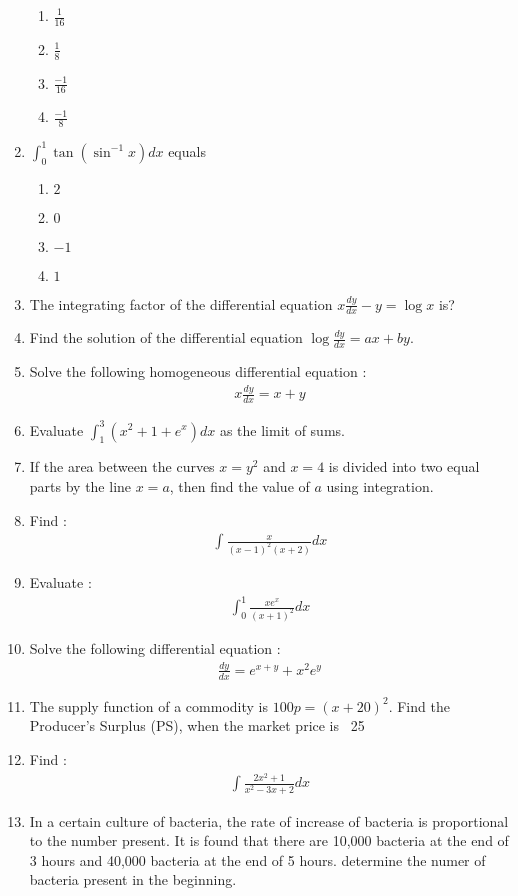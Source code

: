 \documentclass{article}
\begin{document}
\begin{enumerate}
\begin{enumerate}
			\item $\frac{1}{16}$
			\item $\frac{1}{8}$
			\item $\frac{-1}{16}$
			\item $\frac{-1}{8}$
		\end{enumerate}
	\item $\int_0^1 \tan(\sin^{-1}x)dx$ equals
		\begin{enumerate}
			\item $2$
			\item $0$
			\item $-1$
			\item $1$
		\end{enumerate}
	\item The integrating factor of the differential equation $x\frac{dy}{dx}-y=\log x$ is? 
	\item Find the solution of the differential equation $\log \frac{dy}{dx}=ax+by$.
	\item Solve the following homogeneous differential equation :
		\begin{align}
			x\frac{dy}{dx}=x+y
		\end{align}
	\item Evaluate $\int_1^3 (x^2 + 1 + e^x)dx$ as the limit of sums.
	\item If the area between the curves $x=y^2$ and $x=4$ is divided into two equal parts by the line $x=a$, then find the value of $a$ using integration.
	\item Find : 
		\begin{align}
			\int \frac{x}{(x-1)^2(x+2)}dx
		\end{align}
	\item Evaluate :
		\begin{align}
			\int_0^1 \frac{xe^x}{(x+1)^2}dx
		\end{align}
	\item Solve the following differential equation :
		\begin{align}
			\frac{dy}{dx} = e^{x+y} + x^2 e^y
		\end{align}
	\item The supply function of a commodity is $100p=(x+20)^2$. Find the Producer's Surplus (PS), when the market price is \rupee~25
	\item Find :
		\begin{align}
			\int \frac{2x^2 +1}{x^2 - 3x +2}dx
		\end{align}
	\item In a certain culture of bacteria, the rate of increase of bacteria is proportional to the number present. It is found that there are 10,000 bacteria at the end of 3 hours and 40,000 bacteria at the end of 5 hours. determine the numer of bacteria present in the beginning.
\end{enumerate}
\end{document}
